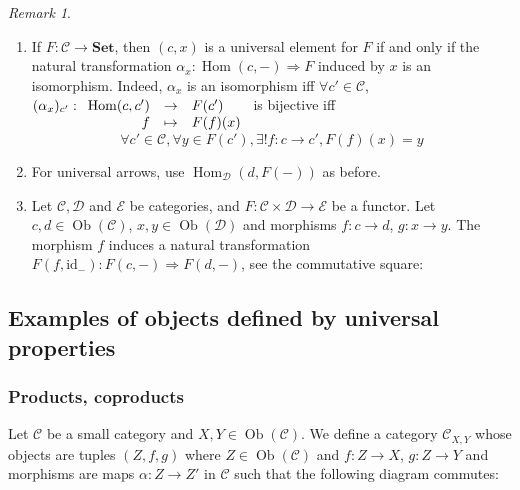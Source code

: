 \documentclass{article}
\newcommand{\id}{\mathrm{id}}
\newcommand{\cat}{\mathcal{C}}
\newcommand{\catt}{\mathcal{D}}
\newcommand{\Set}{\mathbf{Set}}
\DeclareMathOperator{\Ob}{Ob}
\DeclareMathOperator{\Hom}{Hom}
\newcommand{\applic}[4]{\begin{array}[t]{rcl}
#1 & \to & #2 \\
#3 & \mapsto & #4
\end{array}}
\theoremstyle{plain}
\theoremstyle{definition}
\theoremstyle{remark}
\newtheorem*{remark}{Remark}
\begin{document}
\begin{remark} \leavevmode
    \begin{enumerate}
        \item If $F : \cat \to \Set$, then $(c,x)$ is a universal element for $F$ if and only if the natural transformation $\alpha_x : \Hom(c,-) \Rightarrow F$ induced by $x$ is an isomorphism. Indeed, $\alpha_x$ is an isomorphism iff $\forall c' \in \cat$, $(\alpha_x)_{c'} : \applic{\Hom(c,c')}{F(c')}{f}{F(f)(x)}$ is bijective iff
        \[\forall c' \in \cat, \forall y \in F(c'), \exists ! f : c \to c', F(f)(x) = y\]
        \item For universal arrows, use $\Hom_\catt (d,F(-))$ as before.
        \item Let $\cat,\catt$ and $\mathcal{E}$ be categories, and $F : \cat \times \catt \to \mathcal{E}$ be a functor. Let $c,d \in \Ob(\cat)$, $x,y \in \Ob(\catt)$ and morphisms $f : c \to d$, $g : x\to y$. The morphism $f$ induces a natural transformation $F(f,\id_-) : F(c,-) \Rightarrow F(d,-)$, see the commutative square:
        \begin{center}
        \end{center}
    \end{enumerate}
\end{remark}

\subsection{Examples of objects defined by universal properties}

\subsubsection{Products, coproducts}
Let $\cat$ be a small category and $X,Y \in \Ob(\cat)$. We define a category $\cat_{X,Y}$ whose objects are tuples $(Z,f,g)$ where $Z \in \Ob(\cat)$ and $f : Z \to X$, $g : Z \to Y$ and morphisms are maps $\alpha : Z \to Z'$ in $\cat$ such that the following diagram commutes:
\begin{center}
\end{center}
\end{document}
